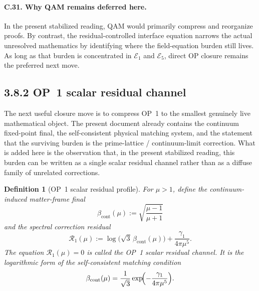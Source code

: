 \documentclass[12pt,a4paper]{article}
\newtheorem{definition}[theorem]{Definition}
\begin{document}
\paragraph{C.31. Why QAM remains deferred here.}
In the present stabilized reading, QAM would primarily compress and reorganize proofs. By contrast, the residual-controlled interface equation narrows the actual unresolved mathematics by identifying where the field-equation burden still lives. As long as that burden is concentrated in \(\mathcal E_{1}\) and \(\mathcal E_{5}\), direct OP closure remains the preferred next move.


\subsection*{3.8.2 OP~1 scalar residual channel}
The next useful closure move is to compress OP~1 to the smallest genuinely live mathematical object. The present document already contains the continuum fixed-point final, the self-consistent physical matching system, and the statement that the surviving burden is the prime-lattice / continuum-limit correction. What is added here is the observation that, in the present stabilized reading, this burden can be written as a single scalar residual channel rather than as a diffuse family of unrelated corrections.

\begin{definition}[OP~1 scalar residual profile]
\label{def:mainline-3820}
For \(\mu>1\), define the continuum-induced matter-frame final
\[
 \beta_{\mathrm{cont}}(\mu):=\sqrt{\frac{\mu-1}{\mu+1}}
\]
and the spectral correction residual
\[
 \mathcal R_{1}(\mu)
 :=
 \log\!\bigl(\sqrt{3}\,\beta_{\mathrm{cont}}(\mu)\bigr)
 +
 \frac{\gamma_1}{4\pi\mu^5}.
\]
The equation \(\mathcal R_{1}(\mu)=0\) is called the \emph{OP~1 scalar residual channel}. It is the logarithmic form of the self-consistent matching condition
\[
 \beta_{\mathrm{cont}}(\mu)
 =
 \frac{1}{\sqrt{3}}\exp\!\Bigl(-\frac{\gamma_1}{4\pi\mu^5}\Bigr).
\]
\end{definition}
\end{document}
